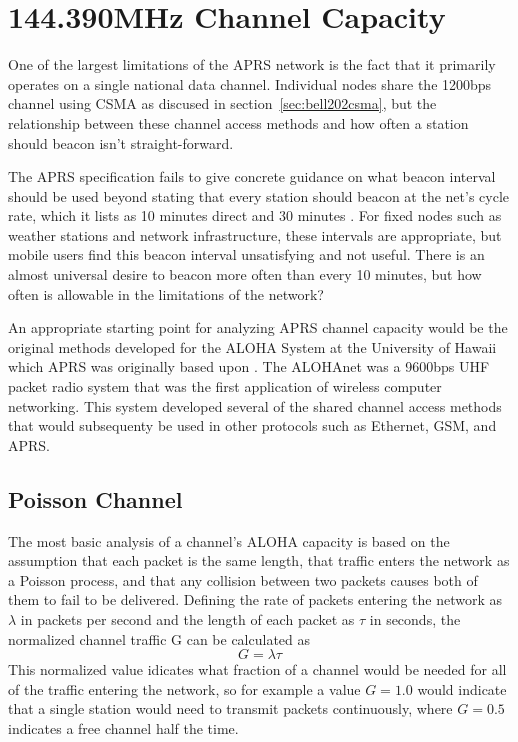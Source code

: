 \chapter{144.390MHz Channel Capacity}

One of the largest limitations of the APRS network is the fact that it primarily operates
on a single national data channel. Individual nodes share the 1200bps channel using 
CSMA as discused in section~\ref{sec:bell202csma}, but the relationship between 
these channel access methods and how often a station should beacon isn't straight-forward.

The APRS specification fails to give concrete guidance on what beacon interval should
be used beyond stating that every station should beacon at the net's cycle rate,
which it lists as 10 minutes direct and 30 minutes \cite[p.~9]{aprsspec}. 
For fixed nodes such as weather stations and network infrastructure, 
these intervals are appropriate, but mobile users find this beacon interval unsatisfying
and not useful. There is an almost universal desire to beacon more often than every 10 minutes,
but how often is allowable in the limitations of the network?

An appropriate starting point for analyzing APRS channel capacity would be the original methods
developed for the ALOHA System at the University of Hawaii
which APRS was originally based upon \cite{packetthroughput}.
The ALOHAnet was a 9600bps UHF packet radio system that was the first application of 
wireless computer networking. 
This system developed several of the shared channel access methods 
that would subsequenty be used in other protocols such as Ethernet, GSM, and APRS.

\section{Poisson Channel}

The most basic analysis of a channel's ALOHA capacity is based on the assumption that
each packet is the same length, that traffic enters the network as a Poisson process,
and that any collision between two packets causes both of them to fail to be delivered.
Defining the rate of packets entering the network as $\lambda$ in packets per second and
the length of each packet as $\tau$ in seconds, the normalized channel traffic G can be
calculated as
\begin{equation}
	G = \lambda \tau
\end{equation}
This normalized value idicates what fraction of a channel would be needed for all
of the traffic entering the network, so for example a value $G=1.0$ would indicate that
a single station would need to transmit packets continuously, where $G=0.5$ indicates 
a free channel half the time. 

